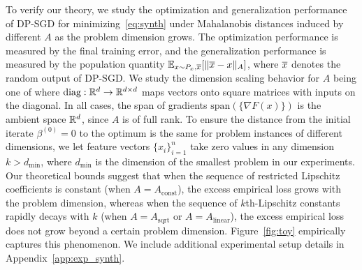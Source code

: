 To verify our theory, we study the optimization and generalization performance of DP-SGD for minimizing~\eqref{eq:synth} under Mahalanobis distances induced by different $A$ as the problem dimension grows. 
The optimization performance is measured by the final training error, and the generalization performance is measured by the population quantity $\mathbb{E}_{x \sim P_x, \overline{x}} [ \| \overline{x} - x \|_A ]$, where $\overline{x}$ denotes the random output of DP-SGD.
We study the dimension scaling behavior for $A$ being one of 
where $\text{diag}: \mathbb{R}^d \to \mathbb{R}^{d \times d}$ maps vectors onto square matrices with inputs on the diagonal.
In all cases, the span of gradients $\text{span}( \{ \nabla F(x) \} )$ is the ambient space $\mathbb{R}^d$, since $A$ is of full rank.
To ensure the distance from the initial iterate $\beta^{(0)} = 0$ to the optimum is the same for problem instances of different dimensions, we let feature vectors $\{x_i\}_{i=1}^n$ take zero values in any dimension $k > d_{\text{min}}$, where $d_{\text{min}}$ is the dimension of the smallest problem in our experiments.
Our theoretical bounds suggest that when the sequence of restricted Lipschitz coefficients is constant (when $A = A_{\text{const}}$), the excess empirical loss grows with the problem dimension, whereas when the sequence of $k$th-Lipschitz constants rapidly decays with $k$ (when $A = A_{\text{sqrt}}$ or $A = A_{\text{linear}}$), the excess empirical loss does not grow beyond a certain problem dimension. 
Figure~\ref{fig:toy} empirically captures this phenomenon. 
We include additional experimental setup details in Appendix~\ref{app:exp_synth}.
